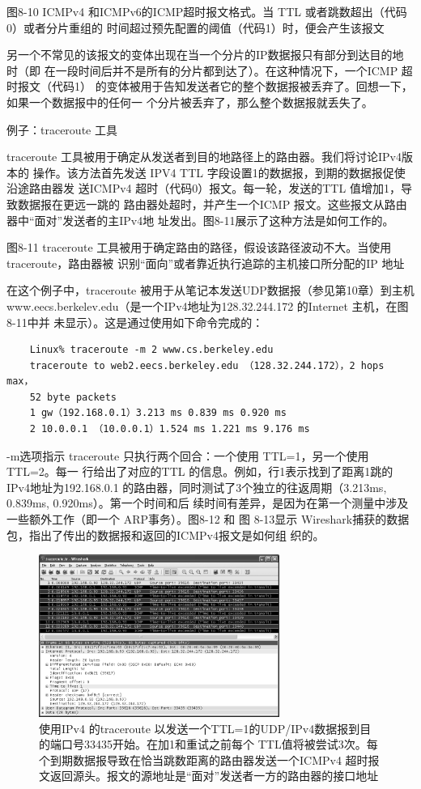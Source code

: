 图8-10	ICMPv4 和ICMPv6的ICMP超时报文格式。当 TTL 或者跳数超出（代码0）或者分片重组的
时间超过预先配置的阈值（代码1）时，便会产生该报文

另一个不常见的该报文的变体出现在当一个分片的IP数据报只有部分到达目的地时（即
在一段时间后并不是所有的分片都到达了）。在这种情况下，一个ICMP 超时报文（代码1）
的变体被用于告知发送者它的整个数据报被丢弃了。回想一下，如果一个数据报中的任何一
个分片被丢弃了，那么整个数据报就丢失了。

例子：traceroute 工具

traceroute 工具被用于确定从发送者到目的地路径上的路由器。我们将讨论IPv4版本的
操作。该方法首先发送 IPV4 TTL 字段设置1的数据报，到期的数据报促使沿途路由器发
送ICMPv4 超时（代码0）报文。每一轮，发送的TTL 值增加1，导致数据报在更远一跳的
路由器处超时，并产生一个ICMP 报文。这些报文从路由器中“面对”发送者的主IPv4地
址发出。图8-11展示了这种方法是如何工作的。


图8-11
traceroute 工具被用于确定路由的路径，假设该路径波动不大。当使用 traceroute，路由器被
识别“面向”或者靠近执行追踪的主机接口所分配的IP 地址

在这个例子中，traceroute 被用于从笔记本发送UDP数据报（参见第10章）到主机
www.eecs.berkelev.edu（是一个IPv4地址为128.32.244.172 的Internet 主机，在图8-11中并
未显示）。这是通过使用如下命令完成的：

\begin{verbatim}
	Linux% traceroute -m 2 www.cs.berkeley.edu
	traceroute to web2.eecs.berkeley.edu （128.32.244.172），2 hops max，
	52 byte packets
	1 gw（192.168.0.1）3.213 ms 0.839 ms 0.920 ms
	2 10.0.0.1 （10.0.0.1）1.524 ms 1.221 ms 9.176 ms
\end{verbatim}

-m选项指示 traceroute 只执行两个回合：一个使用 TTL=1，另一个使用TTL=2。每一
行给出了对应的TTL 的信息。例如，行1表示找到了距离1跳的IPv4地址为192.168.0.1
的路由器，同时测试了3个独立的往返周期（3.213ms, 0.839ms, 0.920ms）。第一个时间和后
续时间有差异，是因为在第一个测量中涉及一些额外工作（即一个 ARP事务）。图8-12 和
图 8-13显示 Wireshark捕获的数据包，指出了传出的数据报和返回的ICMPv4报文是如何组
织的。

\begin{figure}[!htb]
	\centering
	\includegraphics[width=0.7\textwidth]{imgs/8/8-12.png}
	\caption{使用IPv4 的traceroute 以发送一个TTL=1的UDP/IPv4数据报到目的端口号33435开始。在加1和重试之前每个 TTL值将被尝试3次。每个到期数据报导致在恰当跳数距离的路由器发送一个ICMPv4 超时报文返回源头。报文的源地址是“面对”发送者一方的路由器的接口地址}
\end{figure}

